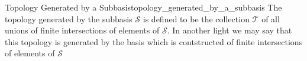\begin{definition}
{Topology Generated by a
Subbasis}{topology_generated_by_a_subbasis}
 The topology generated by the subbasis \(\mathcal{S}\) is defined to be the
 collection \(\mathcal{T}\) of all unions of finite intersections of elements of
 \(\mathcal{S}\). In another light we may say that this topology is generated by
 the basis which is contstructed of finite intersections of elements of \(
 \mathcal{S} \)
\end{definition}
